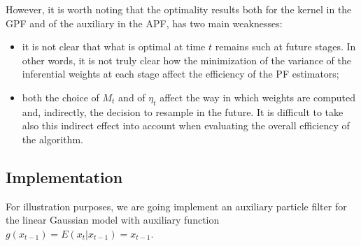 \documentclass[
]{book}
\theoremstyle{break}
\theoremstyle{nonumberplain}
\begin{document}
However, it is worth noting that the optimality results both for the
kernel in the GPF and of the auxiliary in the APF, has two main
weaknesses:

\begin{itemize}
    \item it is not clear that what is optimal at time $t$ remains such at future stages. In other words, it is not truly clear how the minimization of the variance of the inferential weights at each stage affect the efficiency of the PF estimators;
    \item both the choice of $M_t$ and of $\eta_t$ affect the way in which weights are computed and, indirectly, the decision to resample in the future. It is difficult to take also this indirect effect into account when evaluating the  overall efficiency of the algorithm.
\end{itemize}

\subsection{Implementation}

For illustration purposes, we are going implement an auxiliary particle
filter for the linear Gaussian model with auxiliary function
\(g(x_{t-1})=E(x_{t}|x_{t-1})=x_{t-1}\).
\end{document}
